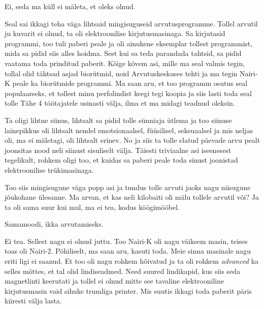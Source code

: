 Ei, seda ma küll ei mäleta, et oleks olnud.


Seal sai ikkagi teha väga lihtsaid mingisuguseid arvutusprogramme. Tollel 
arvutil ju kuvarit ei olnud, ta oli elektroonilise kirjutusmasinaga. Sa 
kirjutasid programmi, too tuli paberi peale ja  oli ainukene eksemplar tollest 
programmist, mida sa pidid siis alles hoidma. Sest kui sa teda parandada 
tahtsid, sa pidid vaatama toda prinditud paberit. Kõige kõvem asi, mille ma 
seal valmis tegin, tollal olid tähtsad asjad biorütmid, noid Arvutuskeskuses 
tehti ja  ma tegin Nairi-K peale ka  biorütmide 
programmi. Ma saan aru, et too programm osutus seal populaarseks, et tollest 
minu perfolindist keegi tegi koopia ja siis lasti toda seal tolle Tähe 4 
töötajatele usinasti välja, ilma et ma midagi teadnud oleksin.


Ta oligi lihtne siinus,  lihtsalt sa pidid tolle sünniaja ütlema ja too siinuse 
lainepikkus oli lihtsalt nendel emotsionaalsel, füüsilisel,  seksuaalsel ja mis 
neljas oli, ma ei mäletagi, oli lihtsalt erinev.  No ja siis ta tolle elatud 
päevade arvu pealt joonsitas nood neli siinust sisuliselt välja. Täiesti 
triviaalne asi iseenesest tegelikult, rohkem oligi too, et kuidas sa paberi 
peale toda sinust joonistad elektroonilise trükimasinaga. 


Too siis mingisugune väga popp asi ja tundus tolle arvuti jaoks nagu niisugune 
jõukohane ülesanne. Ma arvan, et kas neli kilobaiti oli mälu tollele arvutil 
või? Ja ta oli sama suur kui mul, ma ei tea, kodus köögimööbel.


Samamoodi, ikka arvutamiseks.


Ei tea. Sellest nagu ei olnud juttu. Too Nairi-K oli 
nagu väiksem masin, teises toas oli Nairi-2. Põhiliselt, 
ma saan aru, kasuti toda. Meie sinna masinale nagu eriti ligi ei saanud. Et too 
oli nagu rohkem hõivatud ja ta oli rohkem \emph{advanced} ka selles mõttes, et 
tal olid lindiseadmed. Need suured lindikapid, kus siis seda magnetlinti 
keerutati ja tollel ei olnud mitte see tavaline elektrooniline kirjutusmasin 
vaid sihuke trumliga printer. Mis suutis ikkagi toda paberit  päris kiiresti 
välja lasta.


